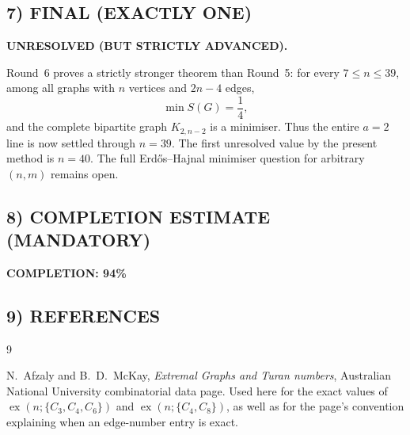 \subsection*{7) FINAL (EXACTLY ONE)}

\textbf{UNRESOLVED (BUT STRICTLY ADVANCED).}

Round~6 proves a strictly stronger theorem than Round~5:
for every $7\le n\le 39$, among all graphs with $n$ vertices and $2n-4$ edges,
\[
\min S(G)=\frac14,
\]
and the complete bipartite graph $K_{2,n-2}$ is a minimiser.
Thus the entire $a=2$ line is now settled through $n=39$.
The first unresolved value by the present method is $n=40$.
The full Erd\H{o}s--Hajnal minimiser question for arbitrary $(n,m)$ remains open.

\subsection*{8) COMPLETION ESTIMATE (MANDATORY)}

\textbf{COMPLETION: 94\%}

\subsection*{9) REFERENCES}

\begin{thebibliography}{9}

N.~Afzaly and B.~D.~McKay,
\emph{Extremal Graphs and Turan numbers},
Australian National University combinatorial data page.
Used here for the exact values of
$\operatorname{ex}(n;\{C_3,C_4,C_6\})$
and
$\operatorname{ex}(n;\{C_4,C_8\})$,
as well as for the page's convention explaining when an edge-number entry is exact.

\end{thebibliography}
